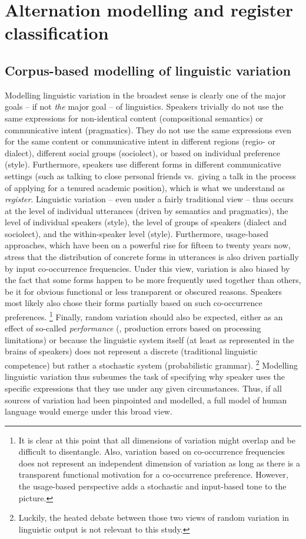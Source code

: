 \section{Alternation modelling and register classification}

\subsection{Corpus-based modelling of linguistic variation}

Modelling linguistic variation in the broadest sense is clearly one of the major goals -- if not \textit{the} major goal -- of linguistics.
Speakers trivially do not use the same expressions for non-identical content (compositional semantics) or communicative intent (pragmatics).
They do not use the same expressions even for the same content or communicative intent in different regions (regio- or dialect), different social groups (sociolect), or based on individual preference (style).
Furthermore, speakers use different forms in different communicative settings (such as talking to close personal friends vs.\ giving a talk in the process of applying for a tenured academic position), which is what we understand as \textit{register}.
Linguistic variation -- even under a fairly traditional view -- thus occurs at the level of individual utterances (driven by semantics and pragmatics), the level of individual speakers (style), the level of groups of speakers (dialect and sociolect), and the within-speaker level (style).
Furthermore, usage-based approaches, which have been on a powerful rise for fifteen to twenty years now, stress that the distribution of concrete forms in utterances is also driven partially by input co-occurrence frequencies.
Under this view, variation is also biased by the fact that some forms happen to be more frequently used together than others, be it for obvious functional or less transparent or obscured reasons.
Speakers most likely also chose their forms partially based on such co-occurrence preferences.%
\footnote{It is clear at this point that all dimensions of variation might overlap and be difficult to disentangle.
Also, variation based on co-occurrence frequencies does not represent an independent dimension of variation as long as there is a transparent functional motivation for a co-occurrence preference.
However, the usage-based perspective adds a stochastic and input-based tone to the picture.}
Finally, random variation should also be expected, either as an effect of so-called \textit{performance} (\ie, production errors based on processing limitations) or because the linguistic system itself (at least as represented in the brains of speakers) does not represent a discrete (traditional linguistic competence) but rather a stochastic system (probabilistic grammar).%
\footnote{Luckily, the heated debate between those two views of random variation in linguistic output is not relevant to this study.}
Modelling linguistic variation thus subsumes the task of specifying why speaker uses the specific expressions that they use under any given circumstances.
Thus, if all sources of variation had been pinpointed and modelled, a full model of human language  would emerge under this broad view.


